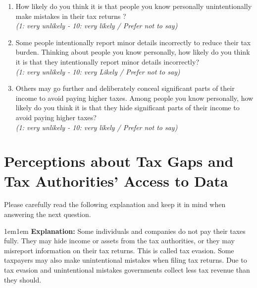 \documentclass[11pt]{article}
\begin{document}
\begin{enumerate}[resume]
    \item How likely do you think it is that people you know personally unintentionally make mistakes in their tax returns ? \\
    \textit{(1: very unlikely - 10: very likely / Prefer not to say)}
    \item Some people intentionally report minor details incorrectly to reduce their tax burden. Thinking about people you know personally, how likely do you think it is that they intentionally report minor details incorrectly?\\
    \textit{(1: very unlikely - 10: very Likely / Prefer not to say)}
    \item Others may go further and deliberately conceal significant parts of their income to avoid paying higher taxes. Among people you know personally, how likely do you think it is that they hide significant parts of their income to avoid paying higher taxes?\\
    \textit{(1: very unlikely - 10: very likely / Prefer not to say)}
\end{enumerate}
\section*{Perceptions about Tax Gaps and Tax Authorities' Access to Data}
\noindent Please carefully read the following explanation and keep it in mind when answering the next question. \\
\begin{adjustwidth}{1em}{1em} \textbf{Explanation:} Some individuals and companies do not pay their taxes fully. They may hide income or assets from the tax authorities, or they may misreport information on their tax returns. This is called tax evasion. Some taxpayers may also make unintentional mistakes when filing tax returns. Due to tax evasion and unintentional mistakes governments collect less tax revenue than they should. 

\end{adjustwidth}
\end{document}
